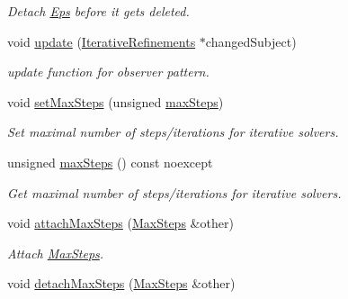 \begin{DoxyCompactItemize}
\begin{DoxyCompactList}\small\item\em Detach \hyperlink{classSpacy_1_1Mixin_1_1Eps}{Eps} before it gets deleted. \end{DoxyCompactList}\item 
\hypertarget{classSpacy_1_1Mixin_1_1IterativeRefinements_adcb6062728331e48515a05f539628062}{}void \hyperlink{classSpacy_1_1Mixin_1_1IterativeRefinements_adcb6062728331e48515a05f539628062}{update} (\hyperlink{classSpacy_1_1Mixin_1_1IterativeRefinements_a0cdc2228af8fe052680d24fc4bb7ed6a_a0cdc2228af8fe052680d24fc4bb7ed6a}{Iterative\+Refinements} $\ast$changed\+Subject)\label{classSpacy_1_1Mixin_1_1IterativeRefinements_adcb6062728331e48515a05f539628062}

\begin{DoxyCompactList}\small\item\em update function for observer pattern. \end{DoxyCompactList}\item 
void \hyperlink{classSpacy_1_1Mixin_1_1MaxSteps_a72f0b7eb50c9a017b5f5e6c2ccf7dfd9_a72f0b7eb50c9a017b5f5e6c2ccf7dfd9}{set\+Max\+Steps} (unsigned \hyperlink{classSpacy_1_1Mixin_1_1MaxSteps_aaeb0b209c78e7b8dd9b268641ce11977_aaeb0b209c78e7b8dd9b268641ce11977}{max\+Steps})
\begin{DoxyCompactList}\small\item\em Set maximal number of steps/iterations for iterative solvers. \end{DoxyCompactList}\item 
unsigned \hyperlink{classSpacy_1_1Mixin_1_1MaxSteps_aaeb0b209c78e7b8dd9b268641ce11977_aaeb0b209c78e7b8dd9b268641ce11977}{max\+Steps} () const noexcept
\begin{DoxyCompactList}\small\item\em Get maximal number of steps/iterations for iterative solvers. \end{DoxyCompactList}\item 
void \hyperlink{classSpacy_1_1Mixin_1_1MaxSteps_a8b093369a1ce5a6323f3dc3c41a738e6_a8b093369a1ce5a6323f3dc3c41a738e6}{attach\+Max\+Steps} (\hyperlink{classSpacy_1_1Mixin_1_1MaxSteps_a8e5d8290884bdc760147862d5b9644dc_a8e5d8290884bdc760147862d5b9644dc}{Max\+Steps} \&other)
\begin{DoxyCompactList}\small\item\em Attach \hyperlink{classSpacy_1_1Mixin_1_1MaxSteps}{Max\+Steps}. \end{DoxyCompactList}\item 
\hypertarget{classSpacy_1_1Mixin_1_1MaxSteps_ac16eca4cd967aed1856f072b08f4aabd}{}void \hyperlink{classSpacy_1_1Mixin_1_1MaxSteps_ac16eca4cd967aed1856f072b08f4aabd}{detach\+Max\+Steps} (\hyperlink{classSpacy_1_1Mixin_1_1MaxSteps_a8e5d8290884bdc760147862d5b9644dc_a8e5d8290884bdc760147862d5b9644dc}{Max\+Steps} \&other)\label{classSpacy_1_1Mixin_1_1MaxSteps_ac16eca4cd967aed1856f072b08f4aabd}


\end{DoxyCompactItemize}
